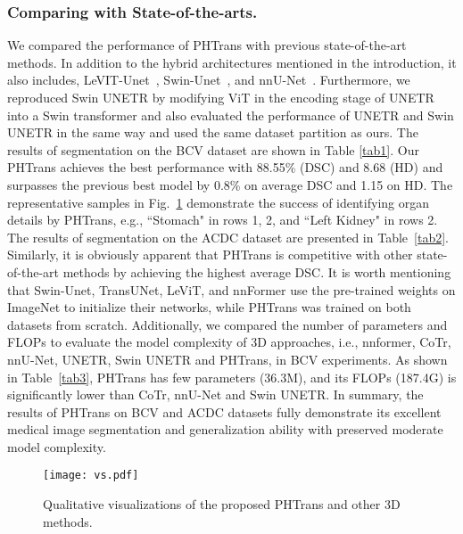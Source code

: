 \documentclass[runningheads]{llncs}
\begin{document}
\subsubsection{Comparing with State-of-the-arts.}

We compared the performance of PHTrans with previous state-of-the-art methods. In addition to the hybrid architectures mentioned in the introduction, it also includes, LeVIT-Unet~\cite{levit}, Swin-Unet~\cite{swin-unet}, and nnU-Net~\cite{nnunet}. Furthermore, we reproduced Swin UNETR\cite{swin-unetr} by modifying ViT in the encoding stage of UNETR\cite{unetr} into a Swin transformer and also evaluated the performance of UNETR and Swin UNETR in the same way and used the same dataset partition as ours. The results of segmentation on the BCV dataset are shown in Table \ref{tab1}. Our PHTrans achieves the best performance with 88.55\% (DSC) and 8.68 (HD) and surpasses the previous best model by 0.8\% on average DSC and 1.15 on HD. The representative samples in Fig.~\ref{fig3} demonstrate the success of identifying organ details by PHTrans, e.g., ``Stomach" in rows 1, 2, and ``Left Kidney" in rows 2. The results of segmentation on the ACDC dataset are presented in Table~\ref{tab2}. Similarly, it is obviously apparent that PHTrans is competitive with other state-of-the-art methods by achieving the highest average DSC. It is worth mentioning that Swin-Unet, TransUNet, LeViT, and nnFormer use the pre-trained weights on ImageNet to initialize their networks, while PHTrans was trained on both datasets from scratch. Additionally, we compared the number of parameters and FLOPs to evaluate the model complexity of 3D approaches, i.e., nnformer, CoTr, nnU-Net, UNETR, Swin UNETR and PHTrans, in BCV experiments. As shown in Table~\ref{tab3}, PHTrans has few parameters (36.3M), and its FLOPs (187.4G) is significantly lower than CoTr, nnU-Net and Swin UNETR. In summary, the results of PHTrans on BCV and ACDC datasets fully demonstrate its excellent medical image segmentation and generalization ability with preserved moderate model complexity.





\begin{figure}[t]
\centering
 \texttt{[image: vs.pdf]}
\caption{Qualitative visualizations of the proposed PHTrans and other 3D methods. } \label{fig3}
\end{figure}
\end{document}
